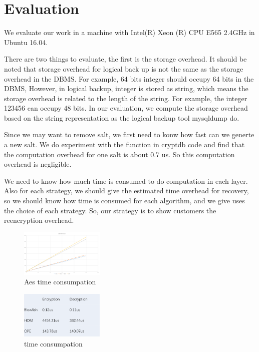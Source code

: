 \section{Evaluation}

We evaluate our work in a machine with Intel(R) Xeon (R) CPU E565 2.4GHz in Ubuntu 16.04. 


There are two things to evaluate, the first is the storage overhead. It should be noted that storage overhead for logical back up is not the same as the storage overhead in the DBMS. For example, 64 bits integer should occupy 64 bits in the DBMS, However, in logical backup, integer is stored as string, which means the storage overhead is related to the length of the string. For example, the integer 123456 can occupy 48 bits. In our evaluation, we compute the storage overhead based on the string representation as the logical backup tool mysqldump do.


Since we may want to remove salt, we first need to konw how fast can we generte a new salt. We do experiment with the function in cryptdb code and find that the computation overhead for one salt is about 0.7 us. So this computation overhead is negligible.



We need to know how much time is consumed to do computation in each layer. Also for each strategy, we should give the estimated time overhead for recovery, so we should know how time is consumed for each algorithm, and we give uses the choice of each strategy. So, our strategy is to show customers the reencryption overhead. 


\begin{figure}[tb]
\centering
\includegraphics[width=4cm]{images/aes.png}
\caption{Aes time consumpation}
\label{fig:stack9}
\end{figure}


\begin{figure}[tb]
\centering
\includegraphics[width=4cm]{images/time.png}
\caption{time consumpation}
\label{fig:stack10}
\end{figure}

